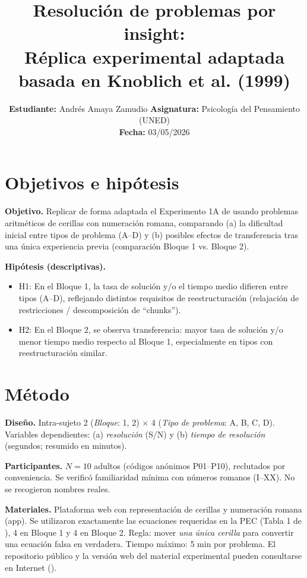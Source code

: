 \documentclass[10pt,a4paper]{article}
\title{\vspace{-1.2em}\textbf{Resolución de problemas por insight:}\\Réplica experimental adaptada basada en Knoblich et al. (1999)}
\author{\textbf{Estudiante:} Andrés Amaya Zamudio \quad \textbf{Asignatura:} Psicología del Pensamiento (UNED) \\ \textbf{Fecha:} 03/05/2026}
\date{}
\begin{document}
\maketitle
\vspace{-1.2em}

\section{Objetivos e hipótesis}
\textbf{Objetivo.} Replicar de forma adaptada el Experimento 1A de \textcite{knoblich1999} usando problemas aritméticos de cerillas con numeración romana, comparando (a) la dificultad inicial entre tipos de problema (A--D) y (b) posibles efectos de transferencia tras una única experiencia previa (comparación Bloque 1 vs. Bloque 2).

\textbf{Hipótesis (descriptivas).}
\begin{itemize}[leftmargin=*, itemsep=0.1em]
    \item H1: En el Bloque 1, la tasa de solución y/o el tiempo medio difieren entre tipos (A--D), reflejando distintos requisitos de reestructuración (relajación de restricciones / descomposición de ``chunks'').
    \item H2: En el Bloque 2, se observa transferencia: mayor tasa de solución y/o menor tiempo medio respecto al Bloque 1, especialmente en tipos con reestructuración similar.
\end{itemize}

\section{Método}
\textbf{Diseño.} Intra-sujeto 2 (\textit{Bloque}: 1, 2) $\times$ 4 (\textit{Tipo de problema}: A, B, C, D). Variables dependientes: (a) \textit{resolución} (S/N) y (b) \textit{tiempo de resolución} (segundos; resumido en minutos).

\textbf{Participantes.} $N=10$ adultos (códigos anónimos P01--P10), reclutados por conveniencia. Se verificó familiaridad mínima con números romanos (I--XX). No se recogieron nombres reales.

\textbf{Materiales.} Plataforma web con representación de cerillas y numeración romana (app). Se utilizaron exactamente las ecuaciones requeridas en la PEC (Tabla 1 de \textcite{knoblich1999}), 4 en Bloque 1 y 4 en Bloque 2. Regla: mover \textit{una única cerilla} para convertir una ecuación falsa en verdadera. Tiempo máximo: 5 min por problema. El repositorio público y la versión web del material experimental pueden consultarse en Internet (\parencite{amaya2026repo,amaya2026web}).
\end{document}
